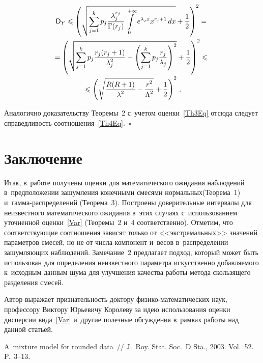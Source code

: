 \begin{multicols}{2}
\noindent
\begin{multline*}
{\sf D}_Y \leqslant \left(\sqrt{\sum\limits_{j=1}^k p_j
\displaystyle\frac{\displaystyle \lambda_j^{r_j}\mathstrut}{\displaystyle \Gamma(r_j)\mathstrut} \int\limits_{0}^{+\infty} 
e^{\lambda_j x}x^{r_j+1}\, dx}+\displaystyle\frac{\displaystyle 1\mathstrut}{\displaystyle 2\mathstrut}\right)^2= {}\\[-0.5pt]
= \left(\sqrt{\sum\limits_{j=1}^{k}p_j
\displaystyle\frac{\displaystyle r_j(r_j+1)\mathstrut}{\displaystyle \lambda_j^2\mathstrut}-\left(\sum\limits_{j=1}^{k}p_j
\displaystyle\frac{\displaystyle r_j\mathstrut}{\displaystyle \lambda_j\mathstrut}\right) ^2}+\displaystyle\frac{\displaystyle 1\mathstrut}{\displaystyle 2\mathstrut}\right)^2\leqslant {}\\[-1.5pt]
{}\leqslant \left(\sqrt{\displaystyle\frac{\displaystyle R(R+1)\mathstrut}{\displaystyle \lambda^2\mathstrut}-\displaystyle\frac{\displaystyle r^2\mathstrut}{\displaystyle \Lambda^2\mathstrut}}+\displaystyle\frac{\displaystyle 1\mathstrut}{\displaystyle 2\mathstrut}\right)^2\,.
\end{multline*}

Аналогично доказательству Тео\-ре\-мы~2 с~учетом оценки~\eqref{Th3Eq} 
отсюда следует справедливость соотношения~\eqref{Th4Eq}.~\hfill$\square$

\vspace*{-12pt}

\section{Заключение}

Итак, в~работе получены оценки для математического ожидания наблюдений в~предположении 
зашумления конечными смесями нормальных\linebreak (Тео\-ре\-ма~1) 
и~гам\-ма-рас\-пре\-де\-ле\-ний (Тео\-ре\-ма~3). 
%
Построены доверительные интервалы 
для неизвестного математического ожидания в~этих случаях с~использованием 
уточненной оценки~\eqref{Var} 
(Тео\-ре\-мы~2 и~4 соответственно). Отметим, что соответствующие соотношения 
зависят только от <<экстремальных>> значений параметров смесей, но не от числа 
компонент и~весов в~распределении зашумляющих наблюдений. 
%
Замечание~2 
предлагает подход, который  может быть использован для определения неизвестного 
параметра искусственно добавляемого к~исходным данным шума для улучшения качества 
работы метода скользящего разделения смесей.

\smallskip
Автор выражает признательность доктору фи\-зи\-ко-ма\-те\-ма\-ти\-че\-ских наук, 
профессору Виктору Юрьевичу Королеву за идею использования оценки 
дисперсии вида~\eqref{Var} и~другие полезные обсуждения в~рамках 
работы над данной статьей.

\vspace*{-12pt}

{\small\frenchspacing
 {%
 \begin{thebibliography}{99}
  
A~mixture model for rounded data~// J.~Roy. Stat. Soc.~D 
Sta., 2003. Vol.~52. P.~3--13.


\end{thebibliography}}}
\end{multicols}
